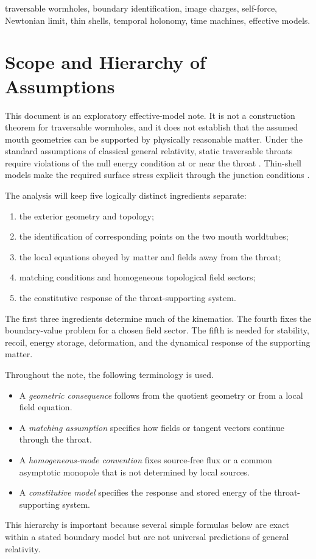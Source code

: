 \documentclass[journal,a4paper]{IEEEtran}
\begin{document}
\begin{IEEEkeywords}
traversable wormholes, boundary identification, image charges, self-force, Newtonian limit, thin shells, temporal holonomy, time machines, effective models.
\end{IEEEkeywords}

\section{Scope and Hierarchy of Assumptions}
\label{sec:scope}

This document is an exploratory effective-model note. It is not a construction theorem for traversable wormholes, and it does not establish that the assumed mouth geometries can be supported by physically reasonable matter. Under the standard assumptions of classical general relativity, static traversable throats require violations of the null energy condition at or near the throat \cite{MorrisThorne1988,Visser1995}. Thin-shell models make the required surface stress explicit through the junction conditions \cite{Israel1966,PoissonToolkit}.

The analysis will keep five logically distinct ingredients separate:
\begin{enumerate}
    \item the exterior geometry and topology;
    \item the identification of corresponding points on the two mouth worldtubes;
    \item the local equations obeyed by matter and fields away from the throat;
    \item matching conditions and homogeneous topological field sectors;
    \item the constitutive response of the throat-supporting system.
\end{enumerate}
The first three ingredients determine much of the kinematics. The fourth fixes the boundary-value problem for a chosen field sector. The fifth is needed for stability, recoil, energy storage, deformation, and the dynamical response of the supporting matter.

Throughout the note, the following terminology is used.
\begin{itemize}
    \item A \emph{geometric consequence} follows from the quotient geometry or from a local field equation.
    \item A \emph{matching assumption} specifies how fields or tangent vectors continue through the throat.
    \item A \emph{homogeneous-mode convention} fixes source-free flux or a common asymptotic monopole that is not determined by local sources.
    \item A \emph{constitutive model} specifies the response and stored energy of the throat-supporting system.
\end{itemize}
This hierarchy is important because several simple formulas below are exact within a stated boundary model but are not universal predictions of general relativity.
\end{document}
